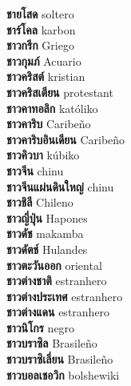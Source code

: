 \textbf{ ชายโสด  } soltero \\
\textbf{ ชาร์โคล  } karbon \\
\textbf{ ชาวกรีก  } Griego \\
\textbf{ ชาวกุมภ์  } Acuario \\
\textbf{ ชาวคริสต์  } kristian \\
\textbf{ ชาวคริสเตียน  } protestant \\
\textbf{ ชาวคาทอลิก  } katóliko \\
\textbf{ ชาวคาริบ  } Caribeño \\
\textbf{ ชาวคาริบอินเดียน  } Caribeño \\
\textbf{ ชาวคิวบา  } kúbiko \\
\textbf{ ชาวจีน  } chinu \\
\textbf{ ชาวจีนแผ่นดินใหญ่  } chinu \\
\textbf{ ชาวชิลี  } Chileno \\
\textbf{ ชาวญี่ปุ่น  } Hapones \\
\textbf{ ชาวดัช  } makamba \\
\textbf{ ชาวดัตช์  } Hulandes \\
\textbf{ ชาวตะวันออก  } oriental \\
\textbf{ ชาวต่างชาติ  } estranhero \\
\textbf{ ชาวต่างประเทศ  } estranhero \\
\textbf{ ชาวต่างแดน  } estranhero \\
\textbf{ ชาวนิโกร  } negro \\
\textbf{ ชาวบราซิล  } Brasileño \\
\textbf{ ชาวบราซิเลี่ยน  } Brasileño \\
\textbf{ ชาวบอลเชอวิก  } bolshewiki \\
